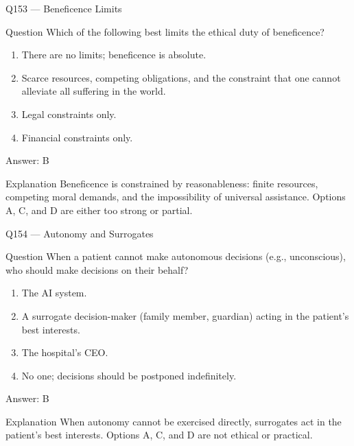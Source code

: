 \documentclass[aspectratio=169,8pt]{beamer}
\begin{document}
\begin{frame}{Q153 --- Beneficence Limits}
\begin{block}{Question}
Which of the following best limits the ethical duty of beneficence?
\begin{enumerate}
\item There are no limits; beneficence is absolute.
\item Scarce resources, competing obligations, and the constraint that one cannot alleviate all suffering in the world.
\item Legal constraints only.
\item Financial constraints only.
\end{enumerate}  \end{block}
\begin{exampleblock}{Answer: B}\end{exampleblock}
\begin{block}{Explanation}
Beneficence is constrained by reasonableness: finite resources, competing moral demands, and the impossibility of universal assistance. Options A, C, and D are either too strong or partial.
\end{block}
\end{frame}

\begin{frame}{Q154 --- Autonomy and Surrogates}
\begin{block}{Question}
When a patient cannot make autonomous decisions (e.g., unconscious), who should make decisions on their behalf?
\begin{enumerate}
\item The AI system.
\item A surrogate decision-maker (family member, guardian) acting in the patient's best interests.
\item The hospital's CEO.
\item No one; decisions should be postponed indefinitely.
\end{enumerate}  \end{block}
\begin{exampleblock}{Answer: B}\end{exampleblock}
\begin{block}{Explanation}
When autonomy cannot be exercised directly, surrogates act in the patient's best interests. Options A, C, and D are not ethical or practical.
\end{block}
\end{frame}
\end{document}
